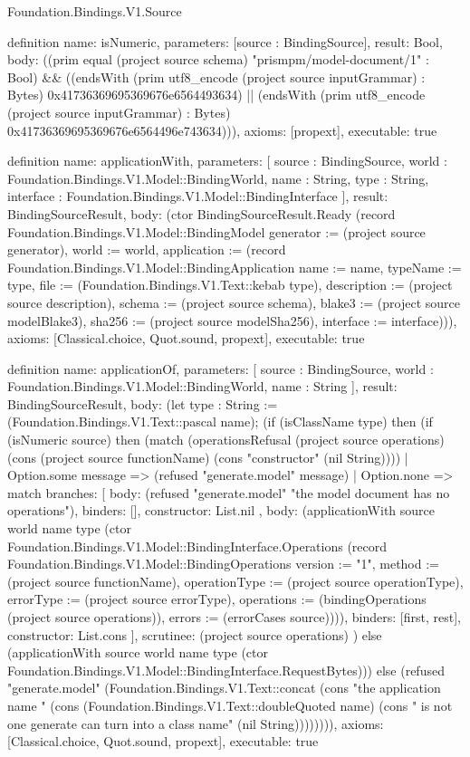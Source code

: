 \begin{lexlean}{Foundation.Bindings.V1.Source}
\begin{semanticmodule}
definition{
  name: isNumeric,
  parameters: [source : BindingSource],
  result: Bool,
  body: ((prim equal (project source schema) "prismpm/model-document/1" : Bool) && ((endsWith (prim utf8_encode (project source inputGrammar) : Bytes) 0x41736369695369676e6564493634) || (endsWith (prim utf8_encode (project source inputGrammar) : Bytes) 0x41736369695369676e6564496e743634))),
  axioms: [propext],
  executable: true
}

definition{
  name: applicationWith,
  parameters: [
    source : BindingSource,
    world : Foundation.Bindings.V1.Model::BindingWorld,
    name : String,
    type : String,
    interface : Foundation.Bindings.V1.Model::BindingInterface
  ],
  result: BindingSourceResult,
  body: (ctor BindingSourceResult.Ready (record Foundation.Bindings.V1.Model::BindingModel {generator := (project source generator), world := world, application := (record Foundation.Bindings.V1.Model::BindingApplication {name := name, typeName := type, file := (Foundation.Bindings.V1.Text::kebab type), description := (project source description), schema := (project source schema), blake3 := (project source modelBlake3), sha256 := (project source modelSha256), interface := interface})})),
  axioms: [Classical.choice, Quot.sound, propext],
  executable: true
}

definition{
  name: applicationOf,
  parameters: [
    source : BindingSource,
    world : Foundation.Bindings.V1.Model::BindingWorld,
    name : String
  ],
  result: BindingSourceResult,
  body: (let type : String := (Foundation.Bindings.V1.Text::pascal name); (if (isClassName type) then (if (isNumeric source) then (match (operationsRefusal (project source operations) (cons (project source functionName) (cons "constructor" (nil String))))
    | Option.some message => (refused "generate.model" message)
    | Option.none => match{
      branches: [
        {
          body: (refused "generate.model" "the model document has no operations"),
          binders: [],
          constructor: List.nil
        },
        {
          body: (applicationWith source world name type (ctor Foundation.Bindings.V1.Model::BindingInterface.Operations (record Foundation.Bindings.V1.Model::BindingOperations {version := "1", method := (project source functionName), operationType := (project source operationType), errorType := (project source errorType), operations := (bindingOperations (project source operations)), errors := (errorCases source)}))),
          binders: [first, rest],
          constructor: List.cons
        }
      ],
      scrutinee: (project source operations)
    }) else (applicationWith source world name type (ctor Foundation.Bindings.V1.Model::BindingInterface.RequestBytes))) else (refused "generate.model" (Foundation.Bindings.V1.Text::concat (cons "the application name " (cons (Foundation.Bindings.V1.Text::doubleQuoted name) (cons " is not one generate can turn into a class name" (nil String)))))))),
  axioms: [Classical.choice, Quot.sound, propext],
  executable: true
}


\end{semanticmodule}
\end{lexlean}
